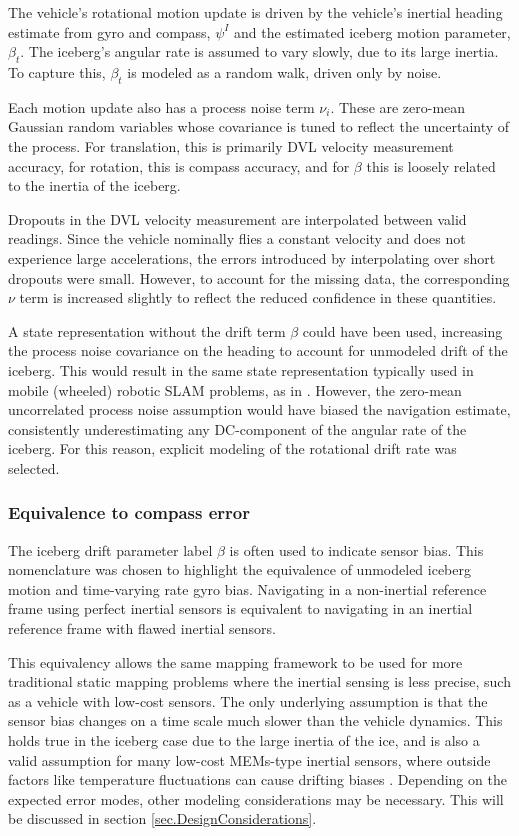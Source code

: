 The vehicle's rotational motion update is driven by the vehicle's inertial heading estimate from gyro and compass, $\psi^I$ and the estimated iceberg motion parameter, $\beta_t$.  The iceberg's angular rate is assumed to vary slowly, due to its large inertia. To capture this, $\beta_t$ is modeled as a random walk, driven only by noise.

Each motion update also has a process noise term $\nu_i$. These are zero-mean Gaussian random variables whose covariance is tuned to reflect the uncertainty of the process. For translation, this is primarily DVL velocity measurement accuracy, for rotation, this is compass accuracy, and for $\beta$ this is loosely related to the inertia of the iceberg. 

Dropouts in the DVL velocity measurement are interpolated between valid readings. Since the vehicle nominally flies a constant velocity and does not experience large accelerations, the errors introduced by interpolating over short dropouts were small. However, to account for the missing data, the corresponding $\nu$ term is increased slightly to reflect the reduced confidence in these quantities.

A state representation without the drift term $\beta$ could have been used, increasing the process noise covariance on the heading to account for unmodeled drift of the iceberg. This would result in the same state representation typically used in mobile (wheeled) robotic SLAM problems, as in \cite{Thrun2005}. However, the zero-mean uncorrelated process noise assumption would have biased the navigation estimate, consistently underestimating any DC-component of the angular rate of the iceberg. For this reason, explicit modeling of the rotational drift rate was selected.

\subsubsection{Equivalence to compass error}

The iceberg drift parameter label $\beta$ is often used to indicate sensor bias. This nomenclature was chosen to highlight the equivalence of unmodeled iceberg motion and time-varying rate gyro bias. Navigating in a non-inertial reference frame using perfect inertial sensors is equivalent to navigating in an inertial reference frame with flawed inertial sensors. 

This equivalency allows the same mapping framework to be used for more traditional static mapping problems where the inertial sensing is less precise, such as a vehicle with low-cost sensors. The only underlying assumption is that the sensor bias changes on a time scale much slower than the vehicle dynamics. This holds true in the iceberg case due to the large inertia of the ice, and is also a valid assumption for many low-cost MEMs-type inertial sensors, where outside factors like temperature fluctuations can cause drifting biases \cite{Keymeulen2005}. Depending on the expected error modes, other modeling considerations may be necessary. This will be discussed in section \ref{sec.DesignConsiderations}.


